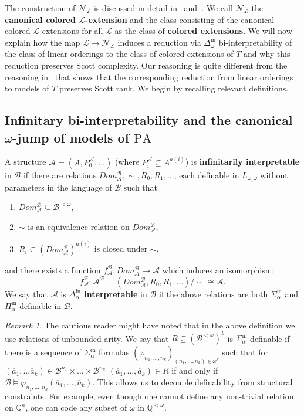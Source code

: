\documentclass[11pt]{amsart}
\providecommand{\tightlist}{%
	\setlength{\itemsep}{0pt}\setlength{\parskip}{0pt}}
\newcommand{\A}{\mathcal{A}}
\newcommand{\B}{\mathcal{B}}
\newcommand{\N}{\mathcal{N}}
\newcommand{\mc}[1]{\mathcal{#1}}
\newcommand{\Pinf}[1]{\Pi^{\mathrm{in}}_{#1}}
\newcommand{\Sinf}[1]{\Sigma^{\mathrm{in}}_{#1}}
\newcommand{\Dinf}[1]{\Delta^{\mathrm{in}}_{#1}}
\newcommand{\PA}{\mathrm{PA}}
\renewcommand{\phi}{\varphi}
\def\A{\mathcal A}
\def\B{\mathcal{B}}
\def\N{{\mathcal N}}
\theoremstyle{remark}
\newtheorem{remark}[thm]{Remark}
\newcommand{\define}[1]{\textbf{#1}}
\newcommand{\ba}{\overline{a}}
\begin{document}
The construction of $\N_\mc{L}$ is discussed in detail in~\cite{KS} and~\cite{MR23}. We call $\N_\mc{L}$ the \define{canonical colored $\mc{L}$-extension} and the class consisting of the canonical colored $\mc{L}$-extensions for all $\mc{L}$ as the class of \define{colored extensions}. We will now explain how the map $\mc{L}\to \N_\mc{L}$ induces a reduction via $\Dinf{\omega}$ bi-interpretability of the class of linear orderings to the class of colored extensions of $T$ and why this reduction preserves Scott complexity. Our reasoning is quite different from the reasoning in~\cite{MR23} that shows that the corresponding reduction from linear orderings to models of $T$ preserves Scott rank. We begin by recalling relevant definitions.

\subsection{Infinitary bi-interpretability and the canonical $\omega$-jump of models of $\PA$}
\begin{definition}\label{def:infint}
  A structure $\A=(A,P_0^\A,\dots)$ (where $P_i^\A\subseteq A^{a(i)}$) is
  \define{infinitarily interpretable} in $\B$ if there are relations
  $Dom_\A^\B,\sim,R_0,R_1,\dots$, each definable in $L_{\omega_1\omega}$ without
  parameters in the language of $\B$ such that
  \begin{enumerate}
    \tightlist
  \item $Dom_\A^\B\subseteq \B^{<\omega}$,
  \item $\sim$ is an equivalence relation on $Dom^\B_\A$,
  \item $R_i\subseteq (Dom^\B_\A)^{a(i)}$ is closed under $\sim$,
  \end{enumerate}
  and there exists a function $f_\A^\B: Dom_\A^\B\to \A$ which induces an
  isomorphism:
  \[ f_\A^\B: \A^\B=(Dom_\A^\B, R_0,R_1,...){/}{\sim}\cong \A.\]
  We say that $\A$ is \define{$\Dinf{\alpha}$ interpretable} in $\B$ if 
  the above relations are both $\Sinf{\alpha}$ and $\Pinf{\alpha}$ definable in
  $\B$.
\end{definition}
\begin{remark}
	The cautious reader might have noted that in the above definition we use relations of unbounded arity.	We say that $R\subseteq (\B^{<\omega})^k$ is $\Sinf{\alpha}$-definable if there is a sequence of $\Sinf{\alpha}$ formulas $(\phi_{n_1,\dots,n_k})_{(n_1,\dots,n_k)\in\omega^k}$ such that for $(\ba_1,\dots \ba_k)\in \B^{n_1}\times \dots\times \B^{n_k}$ $(\ba_1,\dots,\ba_k) \in R$ if and only if $\B\models \phi_{n_1,\dots, n_k}(\ba_1,\dots,\ba_k)$. This allows us to decouple definability from structural constraints. For example, even though one cannot define any non-trivial relation on $\mathbb Q^{n}$, one can code any subset of $\omega$ in $\mathbb Q^{<\omega}$.
\end{remark}
\end{document}
